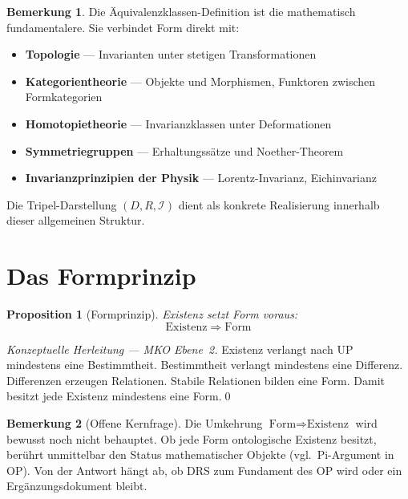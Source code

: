 \documentclass[11pt,a4paper]{article}
\theoremstyle{plain}
\newtheorem{proposition}{Proposition}[section]
\theoremstyle{definition}
\newtheorem{remark}{Bemerkung}[section]
\begin{document}
\begin{remark}
Die \"{A}quivalenzklassen-Definition ist die mathematisch fundamentalere. Sie verbindet
Form direkt mit:
\begin{itemize}
  \item \textbf{Topologie} --- Invarianten unter stetigen Transformationen
  \item \textbf{Kategorientheorie} --- Objekte und Morphismen, Funktoren zwischen
        Formkategorien
  \item \textbf{Homotopietheorie} --- Invarianzklassen unter Deformationen
  \item \textbf{Symmetriegruppen} --- Erhaltungss\"{a}tze und Noether-Theorem
  \item \textbf{Invarianzprinzipien der Physik} --- Lorentz-Invarianz, Eichinvarianz
\end{itemize}
Die Tripel-Darstellung $(D, R, \mathcal{I})$ dient als konkrete Realisierung
innerhalb dieser allgemeinen Struktur.
\end{remark}

\section{Das Formprinzip}

\begin{proposition}[Formprinzip]
Existenz setzt Form voraus:
\[
  \boxed{\text{Existenz} \;\Longrightarrow\; \text{Form}}
\]
\end{proposition}

\begin{proof}[Konzeptuelle Herleitung --- MKO Ebene~2]
Existenz verlangt nach UP mindestens eine Bestimmtheit. Bestimmtheit verlangt
mindestens eine Differenz. Differenzen erzeugen Relationen. Stabile Relationen
bilden eine Form. Damit besitzt jede Existenz mindestens eine Form.\qed
\end{proof}

\begin{remark}[Offene Kernfrage]
Die Umkehrung $\text{Form} \Longrightarrow \text{Existenz}$ wird bewusst noch nicht
behauptet. Ob jede Form ontologische Existenz besitzt, ber\"{u}hrt unmittelbar den
Status mathematischer Objekte (vgl.\ Pi-Argument in OP). Von der Antwort h\"{a}ngt
ab, ob DRS zum Fundament des OP wird oder ein Erg\"{a}nzungsdokument bleibt.
\end{remark}
\end{document}
